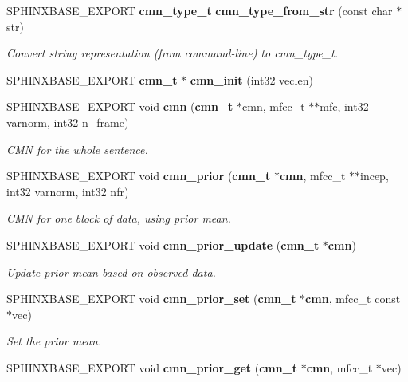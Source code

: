 \begin{DoxyCompactItemize}
\item 
S\-P\-H\-I\-N\-X\-B\-A\-S\-E\-\_\-\-E\-X\-P\-O\-R\-T {\bf cmn\-\_\-type\-\_\-t} {\bf cmn\-\_\-type\-\_\-from\-\_\-str} (const char $\ast$str)\label{cmn_8h_acf5e65a03a0d74630add4a400fed0ce8}

\begin{DoxyCompactList}\small\item\em Convert string representation (from command-\/line) to cmn\-\_\-type\-\_\-t. \end{DoxyCompactList}\item 
S\-P\-H\-I\-N\-X\-B\-A\-S\-E\-\_\-\-E\-X\-P\-O\-R\-T {\bf cmn\-\_\-t} $\ast$ {\bfseries cmn\-\_\-init} (int32 veclen)\label{cmn_8h_a7ba6ce5489afce232b9bb61bd2ebd20f}

\item 
S\-P\-H\-I\-N\-X\-B\-A\-S\-E\-\_\-\-E\-X\-P\-O\-R\-T void {\bf cmn} ({\bf cmn\-\_\-t} $\ast$cmn, mfcc\-\_\-t $\ast$$\ast$mfc, int32 varnorm, int32 n\-\_\-frame)
\begin{DoxyCompactList}\small\item\em C\-M\-N for the whole sentence. \end{DoxyCompactList}\item 
S\-P\-H\-I\-N\-X\-B\-A\-S\-E\-\_\-\-E\-X\-P\-O\-R\-T void {\bf cmn\-\_\-prior} ({\bf cmn\-\_\-t} $\ast${\bf cmn}, mfcc\-\_\-t $\ast$$\ast$incep, int32 varnorm, int32 nfr)
\begin{DoxyCompactList}\small\item\em C\-M\-N for one block of data, using prior mean. \end{DoxyCompactList}\item 
S\-P\-H\-I\-N\-X\-B\-A\-S\-E\-\_\-\-E\-X\-P\-O\-R\-T void {\bf cmn\-\_\-prior\-\_\-update} ({\bf cmn\-\_\-t} $\ast${\bf cmn})\label{cmn_8h_aae61df2ec71082520669fc63d94bb1ef}

\begin{DoxyCompactList}\small\item\em Update prior mean based on observed data. \end{DoxyCompactList}\item 
S\-P\-H\-I\-N\-X\-B\-A\-S\-E\-\_\-\-E\-X\-P\-O\-R\-T void {\bf cmn\-\_\-prior\-\_\-set} ({\bf cmn\-\_\-t} $\ast${\bf cmn}, mfcc\-\_\-t const $\ast$vec)\label{cmn_8h_a0f6f70d51143d6a33130650b8d4758ab}

\begin{DoxyCompactList}\small\item\em Set the prior mean. \end{DoxyCompactList}\item 
S\-P\-H\-I\-N\-X\-B\-A\-S\-E\-\_\-\-E\-X\-P\-O\-R\-T void {\bf cmn\-\_\-prior\-\_\-get} ({\bf cmn\-\_\-t} $\ast${\bf cmn}, mfcc\-\_\-t $\ast$vec)\label{cmn_8h_a4f624f5b805288f66fa05b79b1e4f383}


\end{DoxyCompactItemize}
